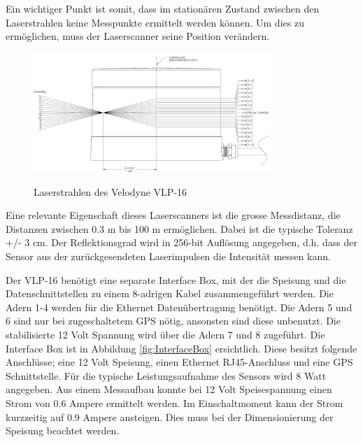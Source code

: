 Ein wichtiger Punkt ist somit, dass im stationären Zustand zwischen den Laserstrahlen keine Messpunkte ermittelt werden können. Um dies zu ermöglichen, muss der Laserscanner seine Position verändern.

\begin{figure}[H]
	\centering
	\includegraphics[width=0.8\textwidth]
	{resources/velodyne_channels.PNG}
	\caption[Laserstrahlen des Velodyne  VLP-16]{Laserstrahlen des Velodyne  VLP-16} \protect\cite{velodyne}
	\label{fig:angleVLP}
\end{figure}

Eine relevante Eigenschaft dieses Laserscanners ist die grosse Messdistanz, die Distanzen zwischen 0.3 m bis 100 m ermöglichen. Dabei ist die typische Toleranz +/- 3 cm. Der Reflektionsgrad wird in 256-bit Auflösung angegeben, d.h. dass der Sensor aus der zurückgesendeten Laserimpulsen die Intensität messen kann.

Der VLP-16 benötigt eine separate Interface Box, mit der die Speisung und die Datenschnittstellen zu einem 8-adrigen Kabel zusammengeführt werden. Die Adern 1-4 werden für die Ethernet Datenübertragung benötigt. Die Adern 5 und 6 sind nur bei zugeschaltetem \ac{GPS} nötig, ansonsten sind diese unbenutzt. Die stabilisierte 12 Volt Spannung wird über die Adern 7 und 8 zugeführt. Die Interface Box ist in Abbildung \ref{fig:InterfaceBox} ersichtlich. Diese besitzt folgende Anschlüsse; eine 12 Volt Speisung, einen Ethernet RJ45-Anschluss und eine \ac{GPS} Schnittstelle. Für die typische Leistungsaufnahme des Sensors wird 8 Watt angegeben. Aus einem Messaufbau konnte bei 12 Volt Speisespannung einen Strom von 0.6 Ampere ermittelt werden. Im Einschaltmoment kann der Strom kurzzeitig auf 0.9 Ampere ansteigen. Dies muss bei der Dimensionierung der Speisung beachtet werden.  

